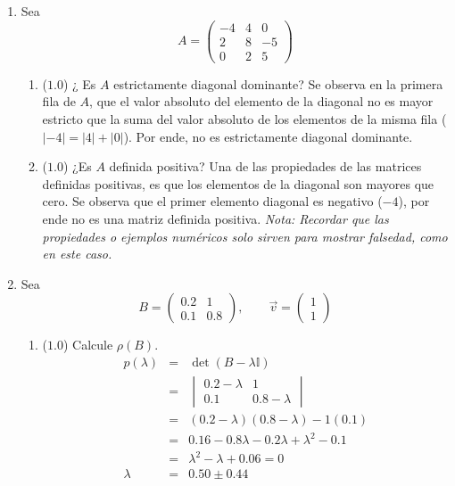 \documentclass[12pt]{article}
\newcommand{\I}{\ensuremath{\mathbb{I}}}
\begin{document}
  \begin{enumerate}[leftmargin=*,widest=9]
    \item Sea
    \[
    A = \begin{pmatrix}
    -4 & 4 & 0\\ 2 & 8 & -5\\ 0 & 2 & 5
    \end{pmatrix}
    \]     
    \begin{enumerate}[label=\alph*]
    \item (\(1.0\)) ¿ Es \(A\) estrictamente diagonal dominante?
    Se observa en la primera fila de \(A\), que el valor absoluto del elemento de la diagonal no es mayor estricto que la suma del valor absoluto de los elementos de la misma fila ( \(|-4| = |4|+|0|\)). Por ende, no es estrictamente diagonal dominante.
    \item (\(1.0\)) ¿Es \(A\) definida positiva?
Una de las propiedades de las matrices definidas positivas, es que los elementos de la diagonal son mayores que cero. Se observa que el primer elemento diagonal es negativo (\(-4\)), por ende no es una matriz definida positiva.
\textit{Nota: Recordar que las propiedades o ejemplos numéricos solo sirven para mostrar falsedad, como en este caso.}
    \end{enumerate}
    \item Sea
    \[
    B = \begin{pmatrix}
    0.2 & 1 \\ 0.1 & 0.8
    \end{pmatrix}, \qquad \vec{v} = \begin{pmatrix}
    1 \\ 1
    \end{pmatrix}
    \] 
    \begin{enumerate}[label=\alph*]
    \item (\(1.0\)) Calcule \(\rho (B)\).
    \begin{eqnarray*}
    p(\lambda) &=& \det(B - \lambda\I)\\
    & = & \begin{vmatrix}
    0.2-\lambda & 1\\ 0.1 & 0.8-\lambda
    \end{vmatrix} \\
    & = & (0.2-\lambda)(0.8-\lambda) - 1(0.1)\\
    & = & 0.16 -0.8\lambda -0.2\lambda + \lambda^2 -0.1\\
    & = & \lambda^2 - \lambda + 0.06 = 0\\
    \lambda & = & 0.50 \pm 0.44\\

\end{eqnarray*}
\end{enumerate}
\end{enumerate}
\end{document}
